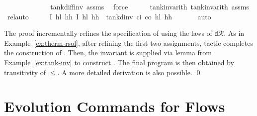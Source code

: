 \documentclass[envcountsame,envcountsect]{llncs}
\newcommand{\dR}{\mathsf{d}\mathcal{R}}
\begin{document}
\begin{example}
\begin{isabellebody}
\ \ \ \ \ \ \ \ \ \isamarkupfalse%
\ {}\ \isamarkupfalse%
\ tank{\isacharunderscore}diff{\isacharunderscore}inv\ assms\ \isamarkupfalse%
\ force{\isacharplus}\isanewline
\ \ \ \ \isamarkupfalse%
\ tank{\isacharunderscore}inv{\isacharunderscore}arith{}\ tank{\isacharunderscore}inv{\isacharunderscore}arith{}\ assms\ \isamarkupfalse%
\ rel{\isacharunderscore}auto{\isacharprime}\isanewline
\ \ \isamarkupfalse%
\ \isamarkupfalse%
\ {\isachardoublequoteopen}\isactrlbold {\isacharbrackleft}I\ h\isactrlsub l\ h\isactrlsub h{\isacharcomma}\ I\ h\isactrlsub l\ h\isactrlsub h\isactrlbold {\isacharbrackright}\ {\isasymge}\ tank{\isacharunderscore}dinv\ c\isactrlsub i\ c\isactrlsub o\ h\isactrlsub l\ h\isactrlsub h\ {\isasymtau}{\isachardoublequoteclose}\isanewline
\ \ \ \ \isamarkupfalse%
\ auto\isanewline
{}\isamarkupfalse%
\isanewline
\end{isabellebody}

\noindent The proof incrementally refines the specification of
 using the laws of $\dR$. As in
Example~\ref{ex:therm-rsol}, after refining the first two assignments,
tactic  completes the construction of
. Then, the invariant is supplied via lemma
 from
Example~\ref{ex:tank-inv} to construct . The final program is then
obtained by transitivity of $\leq$. A more detailed derivation
is also possible. \qed
\end{example}


\section{Evolution Commands for Flows}\label{sec:from-flows}
\end{document}
